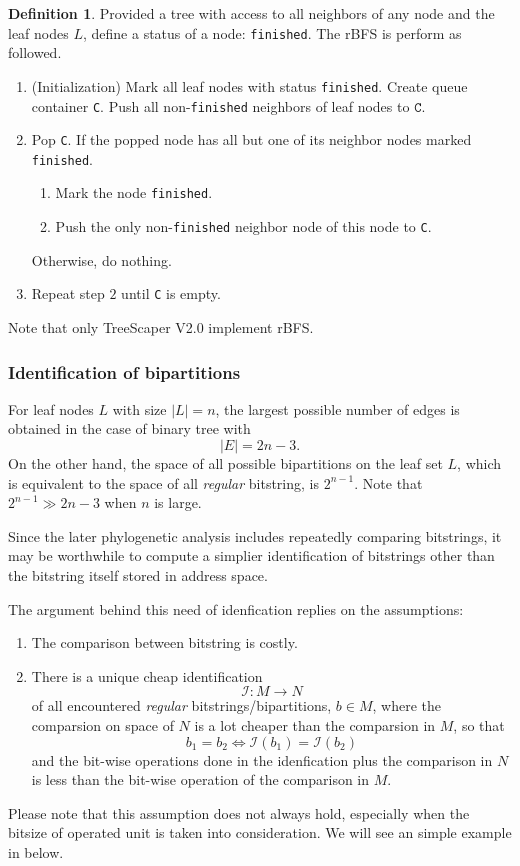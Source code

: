 \documentclass[11pt]{article}
\theoremstyle{definition}
\newtheorem{defn}{Definition}[section]
\theoremstyle{remark}
\theoremstyle{plain}
\begin{document}
\begin{defn}
	Provided a tree with access to all neighbors of any node and the leaf nodes $L$, define a status of a node: \texttt{finished}. The rBFS is perform as followed.

	\begin{enumerate}
		\item (Initialization) Mark all leaf nodes with status \texttt{finished}. Create queue container \texttt{C}. Push all non-\texttt{finished} neighbors of leaf nodes to $\texttt{C}$.
		\item Pop \texttt{C}. If the popped node has all but one of its neighbor nodes marked \texttt{finished}. 
		\begin{enumerate}
			\item Mark the node \texttt{finished}.
			\item Push the only non-\texttt{finished} neighbor node of this node to \texttt{C}.
		\end{enumerate}

		Otherwise, do nothing.
		\item Repeat step $2$ until \texttt{C} is empty.
	\end{enumerate}
\end{defn}

Note that only TreeScaper V2.0 implement rBFS.

\subsubsection{Identification of bipartitions}

For leaf nodes $L$ with size $|L| = n$, the largest possible number of edges is obtained in the case of binary tree with
\[
	|E| = 2n-3.
\]
On the other hand, the space of all possible bipartitions on the leaf set $L$, which is equivalent to the space of all \emph{regular} bitstring, is $2^{n-1}$. Note that $2^{n-1}\gg 2n-3$ when $n$ is large.

Since the later phylogenetic analysis includes repeatedly comparing bitstrings, it may be worthwhile to compute a simplier identification of bitstrings other than the bitstring itself stored in address space.

The argument behind this need of idenfication replies on the assumptions: 
\begin{enumerate}
	\item The comparison between bitstring is costly.
	\item There is a unique cheap identification $$\mathcal{I}:M\to N$$ of all encountered \emph{regular} bitstrings/bipartitions, $b\in M$, where the comparsion on space of $N$ is a lot cheaper than the comparsion in $M$, so that $$b_1 = b_2 \Leftrightarrow \mathcal{I}(b_1) = \mathcal{I}(b_2)$$
	and the bit-wise operations done in the idenfication plus the comparison in $N$ is less than the bit-wise operation of the comparison in $M$.
\end{enumerate}
Please note that this assumption does not always hold, especially when the bitsize of operated unit is taken into consideration. We will see an simple example in below.
\end{document}
